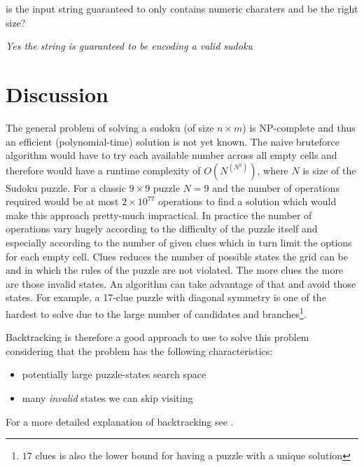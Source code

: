 \begin{QandA}
	\item is the input string guaranteed to only contains numeric charaters and be the right size?
	\begin{answered}
		\textit{Yes the string is guaranteed to be encoding a valid sudoku}
	\end{answered}	
\end{QandA}

\section{Discussion}
\label{sudoku:sec:discussion}
The general problem of solving a sudoku (of size $n\times m$) is NP-complete and thus an efficient
(polynomial-time) solution is not yet known. The naive bruteforce algorithm would have to try each
available number across all empty cells and therefore would have a runtime complexity of
$O(N^(N^2))$, where $N$ is size of the Sudoku puzzle. For a classic  $9 \times 9$ puzzle $N = 9$ and
the number of operations required would be at most $2 \times 10^77$ operations to find a solution
which would make this approach pretty-much impractical. In practice the number of operations vary
hugely according to the difficulty of the puzzle itself and especially according to the number of
given clues which in turn limit the options for each empty cell. Clues reduces the number of
possible states the grid can be and in which the rules of the puzzle are not violated. The more
clues the more are those invalid states. An algorithm can take advantage of that and avoid those
states. For example, a 17-clue puzzle with diagonal symmetry is one of the hardest to solve due to
the large number of candidates and branches\footnote{$17$ clues is also the lower bound for having a
puzzle with a unique solution}. 

Backtracking is therefore a good approach to use to solve this problem considering that the problem
has the following characteristics:
\begin{itemize}
	\item potentially large puzzle-states search space
	\item many \textit{invalid} states we can skip visiting
\end{itemize}
For a more detailed explanation of backtracking see \cite{backtracking}.

